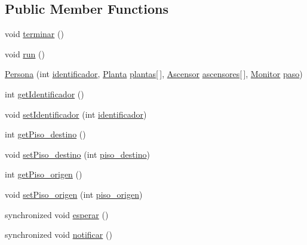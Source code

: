 \subsection*{Public Member Functions}
\begin{DoxyCompactItemize}
\item 
void \mbox{\hyperlink{classpecl6part2_1_1_persona_a30df78707ca9769785f4e648005c918c}{terminar}} ()
\item 
void \mbox{\hyperlink{classpecl6part2_1_1_persona_ac818695ca21e23927cf0390139e5ca24}{run}} ()
\item 
\mbox{\hyperlink{classpecl6part2_1_1_persona_a604c22d8cb049c4c6dddaa9cdcb8e51f}{Persona}} (int \mbox{\hyperlink{classpecl6part2_1_1_persona_a8b7b7d11bc23cac7514d1e3c20267589}{identificador}}, \mbox{\hyperlink{classpecl6part2_1_1_planta}{Planta}} \mbox{\hyperlink{classpecl6part2_1_1_persona_a8c92dc1ec730569cae9d9e4f7f04f6fc}{plantas}}\mbox{[}$\,$\mbox{]}, \mbox{\hyperlink{classpecl6part2_1_1_ascensor}{Ascensor}} \mbox{\hyperlink{classpecl6part2_1_1_persona_a3e0fca0322fb911f7fb38ad78b46b70f}{ascensores}}\mbox{[}$\,$\mbox{]}, \mbox{\hyperlink{classpecl6part2_1_1_monitor}{Monitor}} \mbox{\hyperlink{classpecl6part2_1_1_persona_aa2db1862ae911bee400535c215f5740a}{paso}})
\item 
int \mbox{\hyperlink{classpecl6part2_1_1_persona_aa3e90842881a71eae3b5c1b542cf41bc}{get\+Identificador}} ()
\item 
void \mbox{\hyperlink{classpecl6part2_1_1_persona_a956943876e65847cb04205997981c799}{set\+Identificador}} (int \mbox{\hyperlink{classpecl6part2_1_1_persona_a8b7b7d11bc23cac7514d1e3c20267589}{identificador}})
\item 
int \mbox{\hyperlink{classpecl6part2_1_1_persona_a01b814c668271969c7990f9e5470a8ed}{get\+Piso\+\_\+destino}} ()
\item 
void \mbox{\hyperlink{classpecl6part2_1_1_persona_a38bfea69924f22a88618ff2ae79b798d}{set\+Piso\+\_\+destino}} (int \mbox{\hyperlink{classpecl6part2_1_1_persona_af4ceab86e7c49fa1416c701c21479a8b}{piso\+\_\+destino}})
\item 
int \mbox{\hyperlink{classpecl6part2_1_1_persona_a79b79dc6c0c6e0c1ef89f67a4f59fec2}{get\+Piso\+\_\+origen}} ()
\item 
void \mbox{\hyperlink{classpecl6part2_1_1_persona_a416b5dd477369f8ccbe23385450142c7}{set\+Piso\+\_\+origen}} (int \mbox{\hyperlink{classpecl6part2_1_1_persona_a64acff116f7c56e347369ec54c9109ad}{piso\+\_\+origen}})
\item 
synchronized void \mbox{\hyperlink{classpecl6part2_1_1_persona_a6b30d874756422ab1dfd20f5101cfd4e}{esperar}} ()
\item 
synchronized void \mbox{\hyperlink{classpecl6part2_1_1_persona_aeb2c3dfeddf1a677bc043f05febc8839}{notificar}} ()
\end{DoxyCompactItemize}
